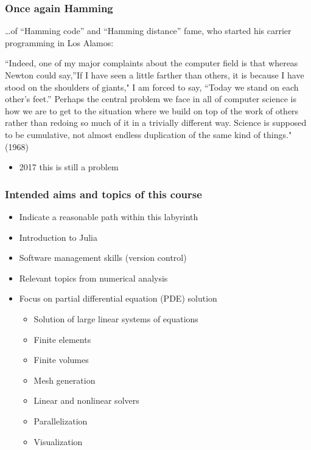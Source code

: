 \begin{frame}\frametitle{Once again Hamming}

  \ldots{}of ``Hamming code'' and ``Hamming distance'' fame, who started
  his carrier programming in Los Alamos:

  ``Indeed, one of my major complaints about the computer field is that
  whereas Newton could say,''If I have seen a little farther than others,
  it is because I have stood on the shoulders of giants," I am forced to
  say, ``Today we stand on each other's feet.'' Perhaps the central
  problem we face in all of computer science is how we are to get to the
  situation where we build on top of the work of others rather than
  redoing so much of it in a trivially different way. Science is supposed
  to be cumulative, not almost endless duplication of the same kind of
  things." (1968)

  \begin{itemize}
    \tightlist
  \item
    2017 this is still a problem
  \end{itemize}

\end{frame}

\begin{frame}\frametitle{Intended  aims  and topics of this course}

  \begin{itemize}
  \item
    Indicate a reasonable path within this labyrinth
  \item
    Introduction to  Julia
  \item
    Software management skills (version control)
  \item
    Relevant topics from numerical analysis
  \item
    Focus on partial differential equation (PDE) solution
    \begin{itemize}
      \tightlist
    \item Solution of large linear systems of equations
    \item
      Finite elements
    \item
      Finite volumes
    \item
      Mesh generation
    \item
      Linear and nonlinear solvers
    \item
      Parallelization
    \item
      Visualization
    \end{itemize}
  \end{itemize}

\end{frame}

